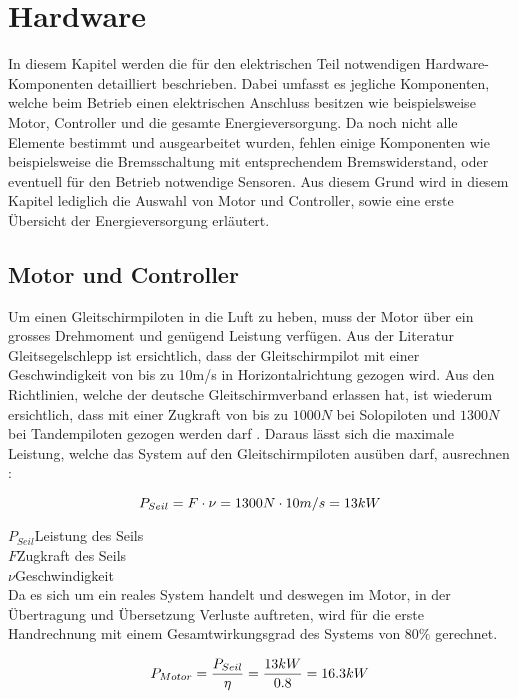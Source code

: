\section{Hardware}\label{sec:Hardware}
In diesem Kapitel werden die für den elektrischen Teil notwendigen Hardware-Komponenten detailliert beschrieben. Dabei umfasst es jegliche Komponenten, welche beim Betrieb einen elektrischen Anschluss besitzen wie beispielsweise Motor, Controller und die gesamte Energieversorgung. Da noch nicht alle Elemente bestimmt und ausgearbeitet wurden, fehlen einige Komponenten wie beispielsweise die Bremsschaltung mit entsprechendem Bremswiderstand, oder eventuell für den Betrieb notwendige Sensoren. Aus diesem Grund wird in diesem Kapitel lediglich die Auswahl von Motor und Controller, sowie eine erste Übersicht der Energieversorgung erläutert.


\subsection{Motor und Controller}\label{subsec:MotorController}
Um einen Gleitschirmpiloten in die Luft zu heben, muss der Motor über ein grosses Drehmoment und genügend Leistung verfügen. Aus der Literatur Gleitsegelschlepp \cite{Gleitsegelschlepp} ist ersichtlich, dass der Gleitschirmpilot mit einer Geschwindigkeit von bis zu 10m/s in Horizontalrichtung gezogen wird. Aus den Richtlinien, welche der deutsche Gleitschirmverband erlassen hat, ist wiederum ersichtlich, dass mit einer Zugkraft von bis zu $ 1000N $ bei Solopiloten und $ 1300N $ bei Tandempiloten gezogen werden darf \cite{WindenProtokoll}. Daraus lässt sich die maximale Leistung, welche das System auf den Gleitschirmpiloten ausüben darf, ausrechnen \cite{Kuchling}:


\begin{equation}
\centering
	P_{Seil}=F \cdot \nu=1300N \cdot 10m/s=13kW
\label{eq:LeistungSeil}
\end{equation}

$ P_{Seil} $\quad 	Leistung des Seils     \\
$ F $\qquad  Zugkraft des Seils    \\
$ \nu $\qquad  Geschwindigkeit     \\

Da es sich um ein reales System handelt und deswegen im Motor, in der Übertragung und Übersetzung Verluste auftreten, wird für die erste Handrechnung mit einem Gesamtwirkungsgrad des Systems von $80\%$ gerechnet.

\begin{equation}
\centering
	P_{Motor}=\frac{P_{Seil}}{\eta}=\frac{13kW}{0.8}=16.3kW
\label{eq:LeistungMotor}
\end{equation}

